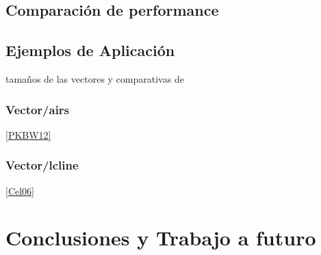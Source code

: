 \documentclass[a4paper,	11pt]{report}
\begin{document}


\section{Comparación de performance}



\section{Ejemplos de Aplicación}
tamaños de las vectores y comparativas de 
\subsection{Vector/airs}
\ref{PKBW12}
\subsection{Vector/lcline}
\ref{Cel06}
\chapter{Conclusiones y Trabajo a futuro}

\nocite{*}



\end{document}

